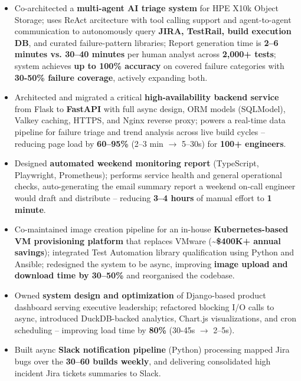 \documentclass[10pt,a4paper]{article}
\begin{document}
\vspace{-2pt}
\begin{itemize}[leftmargin=*, itemsep=0.5pt, topsep=3pt]

\item Co-architected a \textbf{multi-agent AI triage system} for HPE X10k Object Storage; uses ReAct arcitecture with tool calling support and agent-to-agent communication to autonomously query \textbf{JIRA, TestRail, build execution DB}, and curated failure-pattern libraries; Report generation time is \textbf{2--6 minutes vs. 30--40 minutes} per human analyst across \textbf{2,000+ tests}; system achieves \textbf{up to 100\% accuracy} on covered failure categories with \textbf{30-50\% failure coverage}, actively expanding both.

\item Architected and migrated a critical \textbf{high-availability backend service} from Flask to \textbf{FastAPI} with full async design, ORM models (SQLModel), Valkey caching, HTTPS, and Nginx reverse proxy; powers a real-time data pipeline for failure triage and trend analysis across live build cycles -- reducing page load by \textbf{60--95\%} (2--3 min $\rightarrow$ 5--30s) for \textbf{100+ engineers}.

\item Designed \textbf{automated weekend monitoring report} (TypeScript, Playwright, Prometheus); performs service health and general operational checks, auto-generating the email summary report a weekend on-call engineer would draft and distribute -- reducing \textbf{3--4 hours} of manual effort to \textbf{1 minute}.

\item Co-maintained image creation pipeline for an in-house \textbf{Kubernetes-based VM provisioning platform} that replaces VMware (\textbf{\textasciitilde\$400K+ annual savings}); integrated Test Automation library qualification using Python and Ansible; redesigned the system to be async, improving \textbf{image upload and download time by 30--50\%} and reorganised the codebase.

\item Owned \textbf{system design and optimization} of Django-based product dashboard serving executive leadership; refactored blocking I/O calls to async, introduced DuckDB-backed analytics, Chart.js visualizations, and cron scheduling -- improving load time by \textbf{80\%} (30-45s $\rightarrow$ 2--5s).

\item Built async \textbf{Slack notification pipeline} (Python) processing mapped Jira bugs over the \textbf{30--60 builds weekly}, and delivering consolidated high incident Jira tickets summaries to Slack.


\end{itemize}
\end{document}
